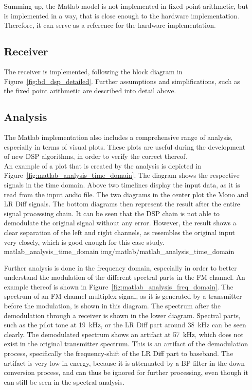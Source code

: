 Summing up, the Matlab model is not implemented in fixed point arithmetic, but is implemented in a way, that is close enough to the hardware implementation.
Therefore, it can serve as a reference for the hardware implementation.


\subsection{Receiver}

The receiver is implemented, following the block diagram in Figure~\ref{fig:bd_dsp_detailed}.
Further assumptions and simplifications, such as the fixed point arithmetic are described into detail above.

\subsection{Analysis}

The Matlab implementation also includes a comprehensive range of analysis, especially in terms of visual plots.
These plots are useful during the development of new DSP algorithms, in order to verify the correct thereof.\\

An example of a plot that is created by the analysis is depicted in Figure~\ref{fig:matlab_analysis_time_domain}.
The diagram shows the respective signals in the time domain.
Above two timelines display the input data, as it is read from the input audio file.
The two diagrams in the center plot the Mono and LR Diff signals.
The bottom diagrams then represent the result after the entire signal processing chain.
It can be seen that the DSP chain is not able to demodulate the original signal without any error.
However, the result shows a clear separation of the left and right channels, as resembles the original input very closely, which is good enough for this case study.\\

 {matlab_analysis_time_domain} {img/matlab/matlab_analysis_time_domain}

Further analysis is done in the frequency domain, especially in order to better understand the modulation of the different spectral parts in the FM channel.
An example thereof is shown in Figure~\ref{fig:matlab_analysis_freq_domain}.
The spectrum of an FM channel multiplex signal, as it is generated by a transmitter before the modulation, is shown in this diagram.
The spectrum after the demodulation through a receiver is shown in the lower diagram.
Spectral parts, such as the pilot tone at 19~kHz, or the LR Diff part around 38~kHz can be seen clearly.
The demodulated spectrum shows an artifact at 57~kHz, which does not exist in the original transmitter spectrum.
This is an artifact of the demodulation process, specifically the frequency-shift of the LR Diff part to baseband.
The artifact is very low in energy, because it is attenuated by a BP filter in the down-conversion process, and can thus be ignored for further processing, even though it can still be seen in the spectral analysis.

